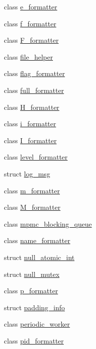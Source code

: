 \begin{DoxyCompactItemize}
\item 
class \hyperlink{classspdlog_1_1details_1_1e__formatter}{e\+\_\+formatter}
\item 
class \hyperlink{classspdlog_1_1details_1_1f__formatter}{f\+\_\+formatter}
\item 
class \hyperlink{classspdlog_1_1details_1_1_f__formatter}{F\+\_\+formatter}
\item 
class \hyperlink{classspdlog_1_1details_1_1file__helper}{file\+\_\+helper}
\item 
class \hyperlink{classspdlog_1_1details_1_1flag__formatter}{flag\+\_\+formatter}
\item 
class \hyperlink{classspdlog_1_1details_1_1full__formatter}{full\+\_\+formatter}
\item 
class \hyperlink{classspdlog_1_1details_1_1_h__formatter}{H\+\_\+formatter}
\item 
class \hyperlink{classspdlog_1_1details_1_1i__formatter}{i\+\_\+formatter}
\item 
class \hyperlink{classspdlog_1_1details_1_1_i__formatter}{I\+\_\+formatter}
\item 
class \hyperlink{classspdlog_1_1details_1_1level__formatter}{level\+\_\+formatter}
\item 
struct \hyperlink{structspdlog_1_1details_1_1log__msg}{log\+\_\+msg}
\item 
class \hyperlink{classspdlog_1_1details_1_1m__formatter}{m\+\_\+formatter}
\item 
class \hyperlink{classspdlog_1_1details_1_1_m__formatter}{M\+\_\+formatter}
\item 
class \hyperlink{classspdlog_1_1details_1_1mpmc__blocking__queue}{mpmc\+\_\+blocking\+\_\+queue}
\item 
class \hyperlink{classspdlog_1_1details_1_1name__formatter}{name\+\_\+formatter}
\item 
struct \hyperlink{structspdlog_1_1details_1_1null__atomic__int}{null\+\_\+atomic\+\_\+int}
\item 
struct \hyperlink{structspdlog_1_1details_1_1null__mutex}{null\+\_\+mutex}
\item 
class \hyperlink{classspdlog_1_1details_1_1p__formatter}{p\+\_\+formatter}
\item 
struct \hyperlink{structspdlog_1_1details_1_1padding__info}{padding\+\_\+info}
\item 
class \hyperlink{classspdlog_1_1details_1_1periodic__worker}{periodic\+\_\+worker}
\item 
class \hyperlink{classspdlog_1_1details_1_1pid__formatter}{pid\+\_\+formatter}

\end{DoxyCompactItemize}
